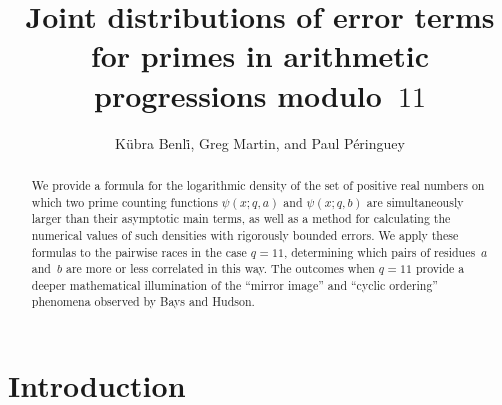 \documentclass[11pt]{article}
\title{Joint distributions of error terms for primes in arithmetic progressions modulo~$11$}
\author{K\"{u}bra Benl\.{i}, Greg Martin, and Paul P\'{e}ringuey}
\date{}
\theoremstyle{plain}
\theoremstyle{definition}
\numberwithin{equation}{section}
\newcommand{\0}{{\vec 0}}
\begin{document}
\maketitle

\begin{abstract}
We provide a formula for the logarithmic density of the set of positive real numbers on which two prime counting functions $\psi(x;q,a)$ and $\psi(x;q,b)$ are simultaneously larger than their asymptotic main terms, as well as a method for calculating the numerical values of such densities with rigorously bounded errors. We apply these formulas to the pairwise races in the case $q=11$, determining which pairs of residues~$a$ and~$b$ are more or less correlated in this way. The outcomes when $q=11$ provide a deeper mathematical illumination of the ``mirror image'' and ``cyclic ordering'' phenomena observed by Bays and Hudson.
\end{abstract}





\section{Introduction}
\end{document}
